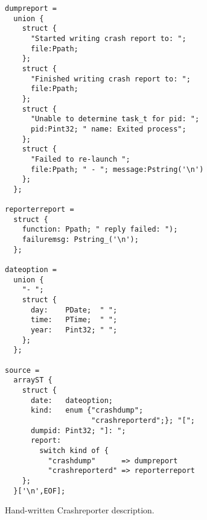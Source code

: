 \begin{figure}[t]
\begin{verbatim}
dumpreport =
  union {
    struct {
      "Started writing crash report to: "; 
      file:Ppath;
    };
    struct {
      "Finished writing crash report to: "; 
      file:Ppath;
    };
    struct {
      "Unable to determine task_t for pid: "; 
      pid:Pint32; " name: Exited process";
    };
    struct {
      "Failed to re-launch "; 
      file:Ppath; " - "; message:Pstring('\n')
    };
  };

reporterreport =
  struct {
    function: Ppath; " reply failed: ");
    failuremsg: Pstring_('\n'); 
  };

dateoption = 
  union {
    "- ";
    struct {
      day:    PDate;  " ";
      time:   PTime;  " ";
      year:   Pint32; " ";
    };
  };

source =
  arrayST {
    struct {
      date:   dateoption;
      kind:   enum {"crashdump"; 
                    "crashreporterd";}; "[";
      dumpid: Pint32; "]: ";
      report: 
        switch kind of {
          "crashdump"      => dumpreport
          "crashreporterd" => reporterreport
    };
  }['\n',EOF];
\end{verbatim}

\caption{Hand-written \ir{} Crashreporter description.}
\label{fig:crashreporter:ir}
\end{figure}
